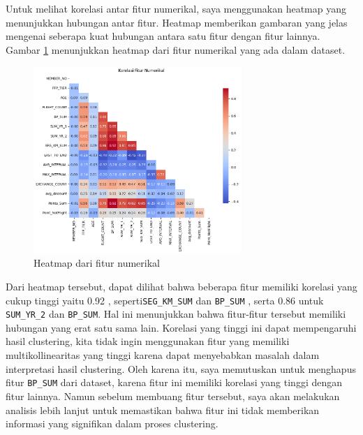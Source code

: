 Untuk melihat korelasi antar fitur numerikal, saya menggunakan heatmap yang menunjukkan hubungan antar fitur. Heatmap memberikan gambaran yang jelas mengenai seberapa kuat hubungan antara satu fitur dengan fitur lainnya. Gambar \ref{fig:heatmap} menunjukkan heatmap dari fitur numerikal yang ada dalam dataset.

\begin{figure}[H]
    \centering
    \includegraphics[width=0.7\textwidth]{gambar/heatmap.png}
    \caption{Heatmap dari fitur numerikal}
    \label{fig:heatmap}
\end{figure}

Dari heatmap tersebut, dapat dilihat bahwa beberapa fitur memiliki korelasi yang cukup tinggi yaitu 0.92 , seperti\texttt{SEG\_KM\_SUM} dan \texttt{BP\_SUM} , serta 0.86 untuk \texttt{SUM\_YR\_2} dan \texttt{BP\_SUM}. Hal ini menunjukkan bahwa fitur-fitur tersebut memiliki hubungan yang erat satu sama lain. Korelasi yang tinggi ini dapat mempengaruhi hasil clustering, kita tidak ingin menggunakan fitur yang memiliki multikollinearitas yang tinggi karena dapat menyebabkan masalah dalam interpretasi hasil clustering. Oleh karena itu, saya memutuskan untuk menghapus fitur \texttt{BP\_SUM} dari dataset, karena fitur ini memiliki korelasi yang tinggi dengan fitur lainnya. Namun sebelum membuang fitur tersebut, saya akan melakukan analisis lebih lanjut untuk memastikan bahwa fitur ini tidak memberikan informasi yang signifikan dalam proses clustering.
